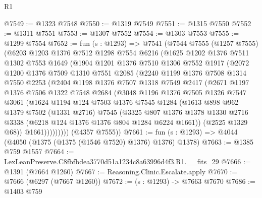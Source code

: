 \begin{lexlean}{R1}
\begin{coremodule}
@7549 := @1323 @7548
@7550 := @1319 @7549
@7551 := @1315 @7550
@7552 := @1311 @7551
@7553 := @1307 @7552
@7554 := @1303 @7553
@7555 := @1299 @7554
@7652 := fun (s : @1293) =>
  @7541
    (@7544
      @7555
      (@1257 @7555)
      (@6203
        @1203
        @1376
        @7512
        @1298
        @7554
        @6216
        (@1625
          @1202
          @1376
          @7511
          @1302
          @7553
          @1649
          (@1904
            @1201
            @1376
            @7510
            @1306
            @7552
            @1917
            (@2072
              @1200
              @1376
              @7509
              @1310
              @7551
              @2085
              (@2240
                @1199
                @1376
                @7508
                @1314
                @7550
                @2253
                (@2404
                  @1198
                  @1376
                  @7507
                  @1318
                  @7549
                  @2417
                  (@2671
                    @1197
                    @1376
                    @7506
                    @1322
                    @7548
                    @2684
                    (@3048
                      @1196
                      @1376
                      @7505
                      @1326
                      @7547
                      @3061
                      (@1624
                        @1194
                        @124
                        @7503
                        @1376
                        @7545
                        @1284
                        (@1613
                          @898
                          @962
                          @1379
                          @7502
                          (@1331 @2716)
                          @7545
                          (@3325
                            @807
                            @1376
                            @1378
                            @1330
                            @2716
                            @3338
                            (@6218 @124 @1376 @1376 @804 @1284 @6224 @1661))
                          (@2525 @1329 @68))
                        @1661)))))))))
      (@4357 @7555))
@7661 := fun (s : @1293) => @4044 (@4050 (@1375 (@1375 (@1546 @7520) @1376) @1376) @1378)
@7663 := @1385 @759 @1557
@7664 := LexLeanPreserve.C8fbfbdea3770d51a1234c8a63996d4f3.R1.__fits_29
@7666 := @1391 (@7664 @1260)
@7667 := Reasoning.Clinic.Escalate.apply
@7670 := @7666 (@6297 (@7667 @1260))
@7672 := (s : @1293) -> @7663 @7670
@7686 := @1403
    @759

\end{coremodule}
\end{lexlean}

